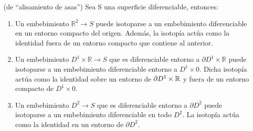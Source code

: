 

\begin{teorema} (de ``alisamiento de asas'')
	Sea S una superficie diferenciable, entonces:
	\begin{enumerate}
		\item Un embebimiento $\mathbb{R}^2 \rightarrow S$ puede isotoparse a un embebimiento diferenciable en un entorno compacto del origen. Además, la isotopía actúa como la identidad fuera de un entorno compacto que contiene al anterior.
		\item Un embebimiento $D^1\times\mathbb{R} \rightarrow S$ que es diferenciable entorno a $\partial D^1\times\mathbb{R}$ puede isotoparse a un embebimiento diferenciable entorno a $D^1\times 0$. Dicha isotopía actúa como la identidad sobre un entorno de $\partial D^1 \times \mathbb{R}$ y fuera de un entorno compacto de $D^1 \times 0$.
		\item Un embebimiento $D^2 \rightarrow S$ que es diferenciable entorno a $\partial D^2$ puede isotoparse a un embebimiento diferenciable en todo $D^2$. La isotopía actúa como la identidad en un entorno de $\partial D^2$.
	\end{enumerate}
\end{teorema}

